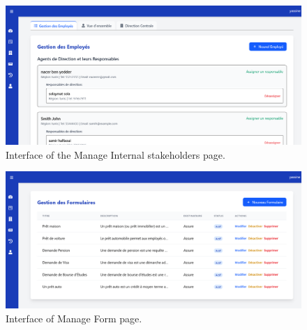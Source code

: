 \begin{figure}[h!]
    \centering
    \includegraphics[width=1\textwidth]{figures/ui-managestakeholders.png}
    \caption{Interface of the Manage Internal stakeholders page.}
\end{figure}
\begin{figure}[h!]
    \centering
    \includegraphics[width=1\textwidth]{figures/ui-manageform.png}
    \caption{Interface of Manage Form page.}
\end{figure}
